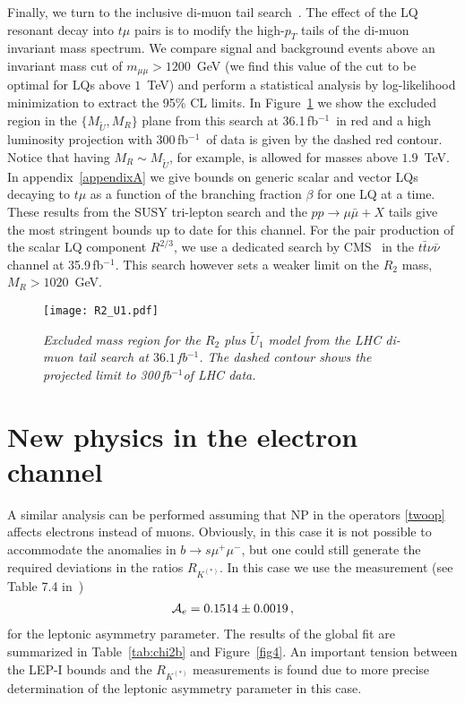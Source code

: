 \documentclass[aps,twocolumn,showpacs,preprintnumbers,amsmath,amssymb,floatfix,nofootinbib]{revtex4-1}
\newcommand{\invfb}{fb$^{-1}$}
\begin{document}
Finally, we turn to the inclusive di-muon tail search~\cite{Aaboud:2017buh}. The effect of the LQ resonant decay into $t\mu$ pairs is to modify the high-$p_T$ tails of the di-muon invariant mass spectrum. We compare signal and background events above an invariant mass cut of $m_{\mu\mu}>1200$~GeV (we find this value of the cut to be optimal for LQs above $1$~TeV) and perform a statistical analysis by log-likelihood minimization to extract the 95\% CL limits. In Figure~\ref{fig:massLQs} we show the excluded region in the $\{M_{\widetilde U},M_{R}\}$ plane from this search at 36.1\,\invfb \,  in red and a high luminosity projection with 300\,\invfb \, of data is given by the dashed red contour. Notice that having $M_{R} \sim M_{\widetilde U}$, for example, is allowed for masses above $1.9$~TeV. In appendix~\ref{appendixA} we give bounds on generic scalar and vector LQs decaying to $t\mu$ as a function of the branching fraction $\beta$ for one LQ at a time. These results from the SUSY tri-lepton search and the $pp\to \mu\bar\mu+X$ tails give the most stringent bounds up to date for this channel. For the pair production of the scalar LQ component $R^{2/3}$, we use a dedicated search by CMS~\cite{CMS:2018bhq} in the $t\bar t\nu\bar\nu$ channel at 35.9\,\invfb. This search however sets a weaker limit on the $R_2$ mass, $M_R>1020$~GeV. 


%
\begin{figure}[htp]
\begin{center}{
\texttt{[image: R2\_U1.pdf]}\\
\caption{\textit{Excluded mass region for the $R_2$ plus $\widetilde U_1$ model from the LHC di-muon tail search at $36.1$\,\invfb. The dashed contour shows the projected limit to 300\,\invfb of LHC data.} \label{fig:massLQs}     } }
\end{center}
\end{figure}


\section{New physics in the electron channel}  \label{secenp}

A similar analysis can be performed assuming that NP in the operators \eqref{twoop} affects electrons instead of muons.  Obviously, in this case it is not possible to accommodate the anomalies in $b \to s \mu^+ \mu^-$, but one could still generate the required deviations in the ratios $R_{K^{(*)}}$.     In this case we use the measurement (see Table 7.4 in~\cite{ALEPH:2005ab})
%
\begin{align}
{\cal{A}}_{e} = 0.1514 \pm 0.0019 \,,
\end{align}
%
for the leptonic asymmetry parameter. The results of the global fit are summarized in Table~\ref{tab:chi2b} and Figure~\ref{fig4}. An important tension between the LEP-I bounds and the $R_{K^{(*)}}$ measurements is found due to more precise determination of the leptonic asymmetry parameter in this case.
\end{document}
